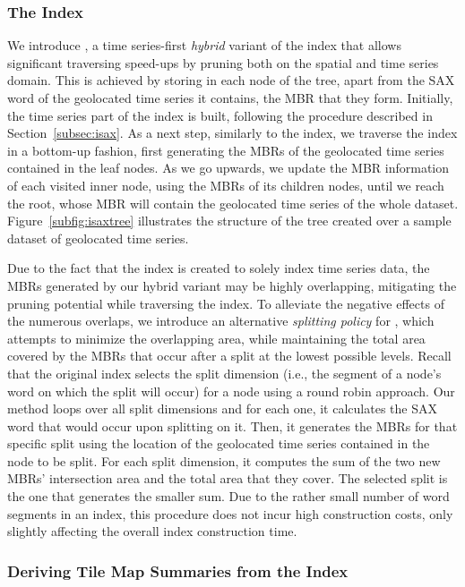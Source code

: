 \subsubsection{The \hisax Index}
\label{subsubsec:hisax}

We introduce \hisax, a time series-first {\em hybrid} variant of the \isax index that allows significant traversing speed-ups by pruning both on the spatial and time series domain. This is achieved by storing in each node of the tree, apart from the SAX word of the geolocated time series it contains, the MBR that they form. Initially, the time series part of the index is built, following the procedure described in Section~\ref{subsec:isax}. As a next step, similarly to the \btsr index, we traverse the index in a bottom-up fashion, first generating the MBRs of the geolocated time series contained in the leaf nodes. As we go upwards, we update the MBR information of each visited inner node, using the MBRs of its children nodes, until we reach the root, whose MBR will contain the geolocated time series of the whole dataset. Figure~\ref{subfig:isaxtree} illustrates the structure of the \hisax tree created over a sample dataset of geolocated time series.

Due to the fact that the \isax index is created to solely index time series data, the MBRs generated by our hybrid variant may be highly overlapping, mitigating the pruning potential while traversing the index. To alleviate the negative effects of the numerous overlaps, we introduce an alternative {\em splitting policy} for \hisax, which attempts to minimize the overlapping area, while maintaining the total area covered by the MBRs that occur after a split at the lowest possible levels. Recall that the original \isax index selects the split dimension (i.e., the segment of a node's word on which the split will occur) for a node using a round robin approach. Our method loops over all split dimensions and for each one, it calculates the SAX word that would occur upon splitting on it. Then, it generates the MBRs for that specific split using the location of the geolocated time series contained in the node to be split. For each split dimension, it computes the sum of the two new MBRs' intersection area and the total area that they cover. The selected split is the one that generates the smaller sum. Due to the rather small number of word segments in an \isax index, this procedure does not incur high construction costs, only slightly affecting the overall index construction time.

\subsubsection{Deriving Tile Map Summaries from the \hisax Index}
\label{subsubsec:tilemapvis}

